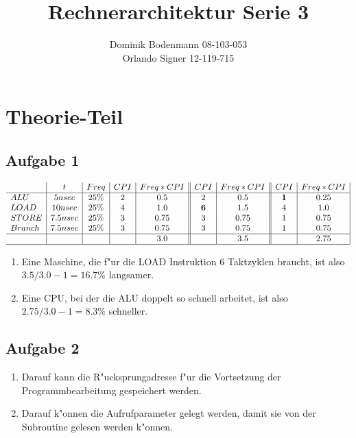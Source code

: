 \documentclass[a4paper,abstracton]{scrartcl}
\title{Rechnerarchitektur Serie 3}
\author{Dominik Bodenmann 08-103-053\\
	Orlando Signer 12-119-715\\}
\begin{document}
\maketitle

\section{Theorie-Teil}
\subsection{Aufgabe 1}
$
\begin{array}{l|c|c|c|c||c|c||c|c|}
 & t & Freq & CPI & Freq*CPI & CPI & Freq*CPI & CPI & Freq*CPI\\
\hline
ALU & 5nsec & 25\% & 2 & 0.5 & 2 & 0.5 & {\bf 1} & 0.25\\
LOAD & 10nsec & 25\% & 4 & 1.0 & {\bf 6} & 1.5 & 4 & 1.0\\
STORE & 7.5nsec & 25\% & 3 & 0.75 & 3 & 0.75 & 1 & 0.75\\
Branch & 7.5nsec & 25\% & 3 & 0.75 & 3 & 0.75 & 1 & 0.75\\
\hline
 & & & & 3.0 & & 3.5 & & 2.75\\
\hline\end{array}
$
\\
\begin{enumerate}
	\item Eine Maschine, die f"ur die LOAD Instruktion 6 Taktzyklen braucht, ist also\\$ 3.5/3.0 - 1 = 16.7\% $ langsamer.
	\item Eine CPU, bei der die ALU doppelt so schnell arbeitet, ist also\\$ 2.75/3.0 -1 = 8.3\% $ schneller.
\end{enumerate}

\subsection{Aufgabe 2}
\begin{enumerate}
	\item Darauf kann die R"ucksprungadresse f"ur die Vortsetzung der Programmbearbeitung gespeichert werden.
	\item Darauf k"onnen die Aufrufparameter gelegt werden, damit sie von der Subroutine gelesen werden k"onnen.
\end{enumerate}
\end{document}
